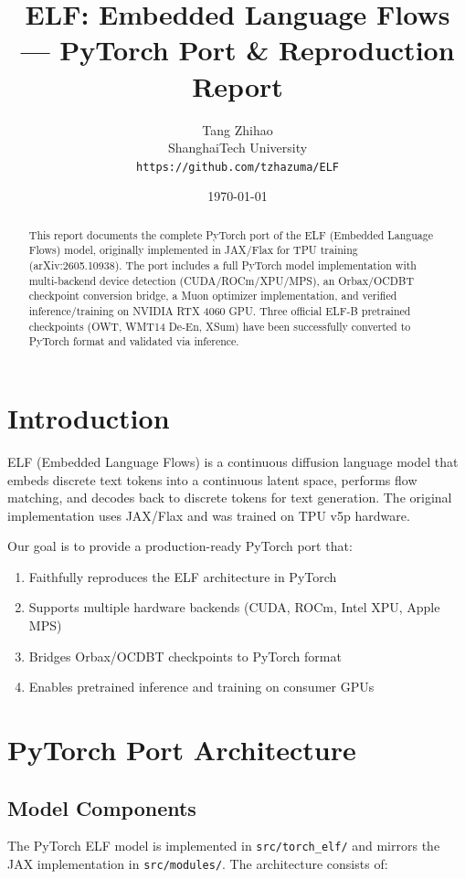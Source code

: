 \documentclass[11pt]{article}
\title{ELF: Embedded Language Flows --- PyTorch Port \& Reproduction Report}
\author{Tang Zhihao \\
ShanghaiTech University \\
\texttt{https://github.com/tzhazuma/ELF}}
\date{\today}
\begin{document}
\maketitle

\begin{abstract}
This report documents the complete PyTorch port of the ELF (Embedded Language Flows) model,
originally implemented in JAX/Flax for TPU training (arXiv:2605.10938).
The port includes a full PyTorch model implementation with multi-backend device detection
(CUDA/ROCm/XPU/MPS), an Orbax/OCDBT checkpoint conversion bridge, a Muon optimizer
implementation, and verified inference/training on NVIDIA RTX 4060 GPU.
Three official ELF-B pretrained checkpoints (OWT, WMT14 De-En, XSum) have been successfully
converted to PyTorch format and validated via inference.
\end{abstract}

\section{Introduction}

ELF (Embedded Language Flows) is a continuous diffusion language model that embeds discrete
text tokens into a continuous latent space, performs flow matching, and decodes back to
discrete tokens for text generation. The original implementation uses JAX/Flax and was
trained on TPU v5p hardware.

Our goal is to provide a production-ready PyTorch port that:
\begin{enumerate}
\item Faithfully reproduces the ELF architecture in PyTorch
\item Supports multiple hardware backends (CUDA, ROCm, Intel XPU, Apple MPS)
\item Bridges Orbax/OCDBT checkpoints to PyTorch format
\item Enables pretrained inference and training on consumer GPUs
\end{enumerate}

\section{PyTorch Port Architecture}

\subsection{Model Components}

The PyTorch ELF model is implemented in \texttt{src/torch\_elf/} and mirrors the JAX
implementation in \texttt{src/modules/}. The architecture consists of:
\end{document}
